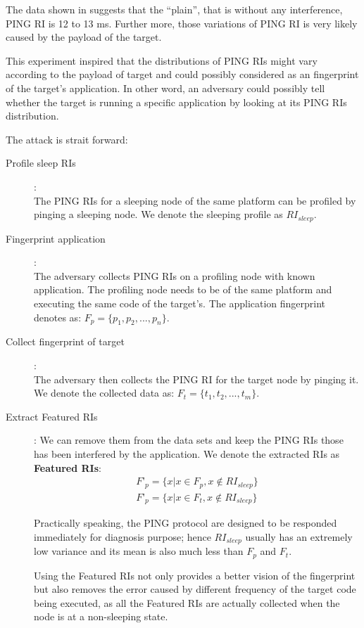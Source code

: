The data shown in  suggests that the “plain”, that is without any interference, PING RI is 12 to 13 ms. Further more, those variations of  PING RI is very likely caused by the payload of the target.

This experiment inspired that the distributions of PING RIs might vary according to the payload of target and could possibly considered as an fingerprint of the target’s application. In other word, an adversary could possibly tell whether the target is running a specific application by looking at its PING RIs distribution.

The attack is strait forward:
\begin{description}
\item[Profile sleep RIs]: \hfill\\
The PING RIs for a sleeping node of the same platform can be profiled by pinging a sleeping node. We denote the sleeping profile as $RI_{sleep}$. 

\item[Fingerprint application]: \hfill\\
The adversary collects PING RIs on a profiling node with known application. The profiling node needs to be of the same platform and executing the same code of the target’s. The application fingerprint denotes as: $F_p=\{p_1, p_2, ... , p_n\}$. 

\item[Collect fingerprint of target]: \hfill\\
The adversary then collects the PING RI for the target node by pinging it. We denote the collected data as: $F_t=\{t_1, t_2, ..., t_m\}$.

\item[Extract Featured RIs]: We can remove them from the data sets and keep the PING RIs those has been interfered by the application. We denote the extracted RIs as \textbf{Featured RIs}:
\begin{eqnarray*}
F’_p = \{x | x \in F_p,  x \notin RI_{sleep}\}\\
F’_p = \{x | x \in F_t,  x \notin RI_{sleep}\}
\end{eqnarray*}

Practically speaking, the PING protocol are designed to be responded immediately for diagnosis purpose; hence $RI_{sleep}$ usually has an extremely low variance and its mean is also much less than $F_p$ and $F_t$.

Using the Featured RIs not only provides a better vision of the fingerprint but also removes the error caused by different frequency of the target code being executed, as all the Featured RIs are actually collected when the node is at a non-sleeping state. 


\end{description}
